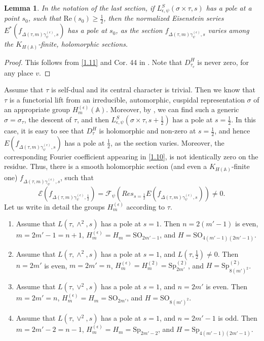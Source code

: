\documentclass[12pts]{amsart}
\newcommand{\BA}{{\mathbb {A}}}
\renewcommand{\Re}{{\mathrm{Re}}}
\newcommand{\SO}{{\mathrm{SO}}}
\newcommand{\Sp}{{\mathrm{Sp}}}
\newtheorem{lem}[thm]{Lemma}
\begin{document}
\begin{lem}\label{lem 2.1}
In the notation of the last section, if $L_{\epsilon,\psi}^S(\sigma\times\tau,s)$ has a pole at a point $s_0$, such that $\Re(s_0)\geq \frac{1}{2}$, then the normalized Eisenstein series $E^*(f_{\Delta(\tau,m)\gamma^{(\epsilon)}_\psi,s})$ has a pole at $s_0$, as the section $f_{\Delta(\tau,m)\gamma^{(\epsilon)}_\psi,s}$ varies among the $K_{H(\BA)}$-finite, holomorphic sections.
\end{lem}	
\begin{proof}
This follows from \eqref{1.11} and Cor. 44 in \cite{CFK18}. Note that $D_{\tau_v}^H$ is never zero, for any place $v$. 
\end{proof}

Assume that $\tau$ is self-dual and its central character is trivial. Then we know that $\tau$ is a functorial lift from an irreducible, automorphic, cuspidal representation $\sigma$ of an appropriate group $H^{(\epsilon)}_m(\BA)$. Moreover, by \cite{GRS11}, we can find such a generic $\sigma=\sigma_\tau$, the descent of $\tau$,  and then $L^S_{\epsilon,\psi}(\sigma\times \tau, s+\frac{1}{2})$ has a pole at $s=\frac{1}{2}$. In this case, it is easy to see that $D_\tau^H$ is holomorphic and non-zero at $s=\frac{1}{2}$, and hence $E(f_{\Delta(\tau,m)\gamma^{(\epsilon)}_\psi,s})$ has a pole at $\frac{1}{2}$, as the section varies. Moreover, the corresponding Fourier coefficient appearing in \eqref{1.10}, is not identically zero on the residue. Thus, there is a smooth holomorphic section (and even a $K_{H(\BA)}$-finite one) $f_{\Delta(\tau,m)\gamma^{(\epsilon)}_\psi,s}$, such that
\begin{equation}\label{2.1}
\mathcal{E}(f_{\Delta(\tau,m)\gamma^{(\epsilon)}_\psi,\frac{1}{2}})=\mathcal{F}_\psi(Res_{s=\frac{1}{2}}E(f_{\Delta(\tau,m)\gamma^{(\epsilon)}_\psi,s}))\neq 0.
\end{equation}
Let us write in detail the groups $H^{(\epsilon)}_m$ according to $\tau$.
\begin{enumerate}
	\item Assume that $L(\tau,\wedge^2,s)$ has a pole at $s=1$. Then $n=2(m'-1)$ is even, $m=2m'-1=n+1$, $H_m^{(\epsilon)}=H_m=\SO_{2m'-1}$, and $H=\SO_{4(m'-1)(2m'-1)}$. \\
	\item Assume that $L(\tau,\wedge^2,s)$ has a pole at $s=1$, and $L(\tau,\frac{1}{2})\neq 0$. Then $n=2m'$ is even, $m=2m'=n$, $H_m^{(\epsilon)}=H^{(2)}_m=\Sp^{(2)}_{2m'}$, and $H=\Sp^{(2)}_{8(m')^2}$.\\
	\item Assume that $L(\tau, \vee^2,s)$ has a pole at $s=1$, and $n=2m'$ is even. Then $m=2m'=n$, $H_m^{(\epsilon)}=H_m=\SO_{2m'}$, and $H=\SO_{8(m')^2}$.\\
	\item Assume that $L(\tau, \vee^2,s)$ has a pole at $s=1$, and $n=2m'-1$ is odd. Then $m=2m'-2=n-1$, $H_m^{(\epsilon)}=H_m=\Sp_{2m'-2}$, and $H=\Sp_{4(m'-1)(2m'-1)}$. 
\end{enumerate}
\end{document}
